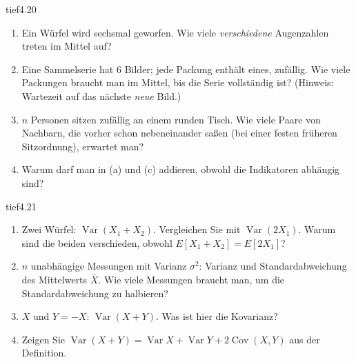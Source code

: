 \begin{karte}{tief}{4.20}{\typtypisch}{}
\begin{enumerate}[label=(\alph*),leftmargin=1.6em,itemsep=2pt]
\item Ein Würfel wird sechsmal geworfen. Wie viele \emph{verschiedene} Augenzahlen treten im Mittel auf?
\item Eine Sammelserie hat $6$ Bilder; jede Packung enthält eines, zufällig. Wie viele Packungen braucht man im Mittel, bis die Serie vollständig ist? (Hinweis: Wartezeit auf das nächste \emph{neue} Bild.)
\item $n$ Personen sitzen zufällig an einem runden Tisch. Wie viele Paare von Nachbarn, die vorher schon nebeneinander saßen (bei einer festen früheren Sitzordnung), erwartet man?
\item Warum darf man in (a) und (c) addieren, obwohl die Indikatoren abhängig sind?
\end{enumerate}
\end{karte}

\begin{karte}{tief}{4.21}{\typtypisch}{}
\begin{enumerate}[label=(\alph*),leftmargin=1.6em,itemsep=2pt]
\item Zwei Würfel: $\operatorname{Var}(X_1 + X_2)$. Vergleichen Sie mit $\operatorname{Var}(2X_1)$. Warum sind die beiden verschieden, obwohl $E[X_1 + X_2] = E[2X_1]$?
\item $n$ unabhängige Messungen mit Varianz $\sigma^{2}$: Varianz und Standardabweichung des Mittelwerts $\bar X$. Wie viele Messungen braucht man, um die Standardabweichung zu halbieren?
\item $X$ und $Y = -X$: $\operatorname{Var}(X + Y)$. Was ist hier die Kovarianz?
\item Zeigen Sie $\operatorname{Var}(X + Y) = \operatorname{Var}X + \operatorname{Var}Y + 2\operatorname{Cov}(X, Y)$ aus der Definition.
\end{enumerate}
\end{karte}

